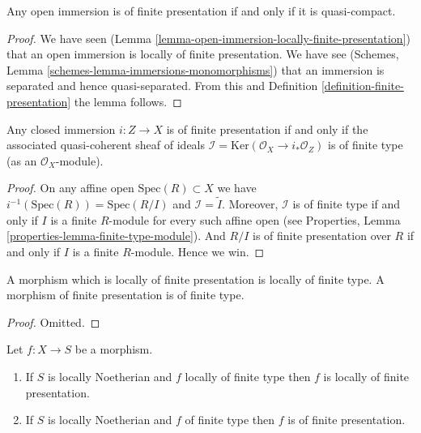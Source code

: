 \begin{lemma}
\label{lemma-quasi-compact-open-immersion-finite-presentation}
Any open immersion is of finite presentation if and only if
it is quasi-compact.
\end{lemma}

\begin{proof}
We have seen (Lemma \ref{lemma-open-immersion-locally-finite-presentation})
that an open immersion is locally of finite presentation.
We have see (Schemes, Lemma \ref{schemes-lemma-immersions-monomorphisms})
that an immersion is separated and hence quasi-separated. From this
and Definition \ref{definition-finite-presentation} the lemma follows.
\end{proof}

\begin{lemma}
\label{lemma-closed-immersion-finite-presentation}
Any closed immersion $i : Z \to X$ is of finite presentation if and only if
the associated quasi-coherent sheaf of ideals
$\mathcal{I} = \text{Ker}(\mathcal{O}_X \to i_*\mathcal{O}_Z)$
is of finite type (as an $\mathcal{O}_X$-module).
\end{lemma}

\begin{proof}
On any affine open $\text{Spec}(R) \subset X$ we have
$i^{-1}(\text{Spec}(R)) = \text{Spec}(R/I)$ and
$\mathcal{I} = \widetilde{I}$. Moreover, $\mathcal{I}$
is of finite type if and only if $I$ is a finite $R$-module
for every such affine open (see
Properties, Lemma \ref{properties-lemma-finite-type-module}).
And $R/I$ is of finite presentation
over $R$ if and only if $I$ is a finite $R$-module. Hence we win.
\end{proof}

\begin{lemma}
\label{lemma-finite-presentation-finite-type}
A morphism which is locally of finite presentation is locally of finite type.
A morphism of finite presentation is of finite type.
\end{lemma}

\begin{proof}
Omitted.
\end{proof}

\begin{lemma}
\label{lemma-noetherian-finite-type-finite-presentation}
Let $f : X \to S$ be a morphism.
\begin{enumerate}
\item If $S$ is locally Noetherian and $f$ locally of finite type
then $f$ is locally of finite presentation.
\item If $S$ is locally Noetherian and $f$ of finite type
then $f$ is of finite presentation.
\end{enumerate}
\end{lemma}

